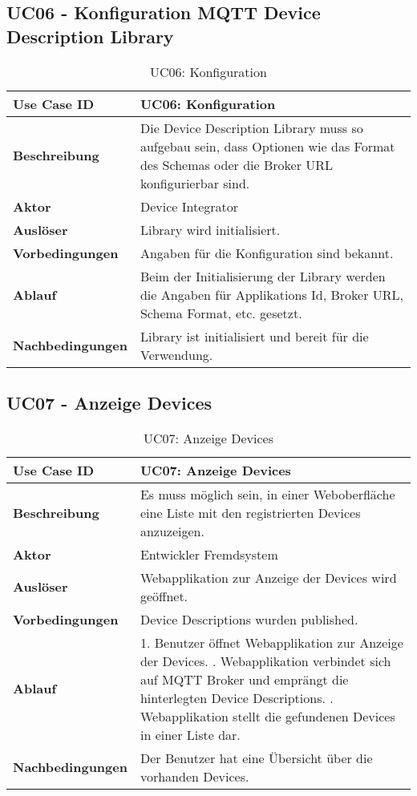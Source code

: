 \subsection{UC06 - Konfiguration MQTT Device Description Library}
\begin{table}[H]
\begin{tabularx}{\textwidth}{|l|X|}

 \hline
 {\bf Use Case ID }    & UC06: Konfiguration \\  \hline
 {\bf Beschreibung }   & Die Device Description Library muss so aufgebau sein, dass Optionen wie das Format des Schemas oder die Broker URL konfigurierbar sind.  \\ \hline
 {\bf Aktor }          & Device Integrator \\ \hline
 {\bf Auslöser }       & Library wird initialisiert. \\ \hline
 {\bf Vorbedingungen } & Angaben für die Konfiguration sind bekannt. \\ \hline
 {\bf Ablauf }         & Beim der Initialisierung der Library werden die Angaben für Applikations Id, Broker URL, Schema Format, etc. gesetzt. \\ \hline
 {\bf Nachbedingungen} & Library ist initialisiert und bereit für die Verwendung. \\ \hline
  
\end{tabularx}
\caption{UC06: Konfiguration}
\end{table}

\subsection{UC07 - Anzeige Devices}

\begin{table}[H]
\begin{tabularx}{\textwidth}{|l|X|}

 \hline
 {\bf Use Case ID }    & UC07: Anzeige Devices \\  \hline
 {\bf Beschreibung }   & Es muss möglich sein, in einer Weboberfläche eine Liste mit den registrierten Devices anzuzeigen. \\ \hline
 {\bf Aktor }          & Entwickler Fremdsystem \\ \hline
 {\bf Auslöser }       & Webapplikation zur Anzeige der Devices wird geöffnet. \\ \hline
 {\bf Vorbedingungen } & Device Descriptions wurden published. \\ \hline
 {\bf Ablauf }         & 
     1. Benutzer öffnet Webapplikation zur Anzeige der Devices. \newline
     2. Webapplikation verbindet sich auf MQTT Broker und emprängt die hinterlegten Device Descriptions. \newline
     3. Webapplikation stellt die gefundenen Devices in einer Liste dar. \\ \hline
 {\bf Nachbedingungen} & Der Benutzer hat eine Übersicht über die vorhanden Devices. \\ \hline
  
\end{tabularx}
\caption{UC07: Anzeige Devices}
\end{table}

